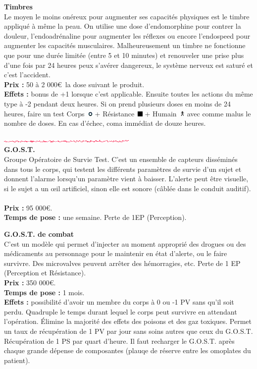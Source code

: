 \documentclass[11pt,twoside,a4paper]{article}
\def\imgCORPS{\includegraphics[width=0.25cm]{../../../../../imgGraphics/rolePlayingGame/SimulacreS/mini12x12/corps.png} }
\def\imgRESIS{\includegraphics[width=0.25cm]{../../../../../imgGraphics/rolePlayingGame/SimulacreS/mini12x12/resistance.png} }
\def\imgHUMAI{\includegraphics[width=0.25cm]{../../../../../imgGraphics/rolePlayingGame/SimulacreS/mini12x12/humain.png} }
\def\barreCyberAgeHalf{\includegraphics[width=0.50\textwidth]{img/Filet_CA.png}}
\begin{document}
\begin{multicols*}{2}
\textbf{Timbres}~\\
Le moyen le moins on{\'e}reux pour augmenter ses capacit{\'e}s physiques est le timbre appliqu{\'e} {\`a} m{\^e}me la peau. On utilise une dose d'endomorphine pour contrer la douleur, l'endoadr{\'e}naline pour augmenter les r{\'e}flexes ou encore l'endospeed pour augmenter les capacit{\'e}s musculaires. Malheureusement un timbre ne fonctionne que pour une dur{\'e}e limit{\'e}e (entre 5 et 10 minutes) et renouveler une prise plus d'une fois par 24 heures peux s'av{\'e}rer dangereux, le syst{\`e}me nerveux est satur{\'e} et c'est l'accident. ~\\
{\small 
	\textbf{Prix : }50 {\`a} 2 000\euro ~la dose suivant le produit. ~\\
	\textbf{Effets : }bonus de +1 lorsque c'est applicable. Ensuite toutes les actions du m{\^e}me type {\`a} -2 pendant deux heures. Si on prend plusieurs doses en moins de 24 heures, faire un test Corps~\imgCORPS + R{\'e}sistance~\imgRESIS + Humain~\imgHUMAI avec comme malus le nombre de doses. En cas d'{\'e}chec, coma imm{\'e}diat de douze heures. ~\\
} %

\barreCyberAgeHalf ~\\


\textbf{G.O.S.T.}~\\
Groupe Op{\'e}ratoire de Survie Test. C'est un ensemble de capteurs diss{\'e}min{\'e}s dans tous le corps, qui testent les diff{\'e}rents param{\`e}tres de survie d'un sujet et donnent l'alarme lorsqu'un param{\`e}tre vient {\`a} baisser. L'alerte peut {\^e}tre visuelle, si le sujet a un \oe il artificiel, sinon elle est sonore (c{\^a}bl{\'e}e dans le conduit auditif). ~\\
{\small 
	\textbf{Prix : }95 000\euro . ~\\
	\textbf{Temps de pose : }une semaine. Perte de 1EP (Perception). ~\\
} %

\textbf{G.O.S.T. de combat}~\\
C'est un mod{\`e}le qui permet d'injecter au moment appropri{\'e} des drogues ou des m{\'e}dicaments au personnage pour le maintenir en {\'e}tat d'alerte, ou le faire survivre. Des microvalves peuvent arr{\^e}ter des h{\'e}morragies, etc. Perte de 1 EP (Perception et R{\'e}sistance). ~\\
{\small 
	\textbf{Prix : }350 000\euro . ~\\
	\textbf{Temps de pose : }1 mois. ~\\
	\textbf{Effets : }possibilit{\'e} d'avoir un membre du corps {\`a} 0 ou -1 PV sans qu'il soit perdu. Quadruple le temps durant lequel le corps peut survivre en attendant l'op{\'e}ration. {\'E}limine la majorit{\'e} des effets des poisons et des gaz toxiques. Permet un taux de r{\'e}cup{\'e}ration de 1 PV par jour sans soins autres que ceux du G.O.S.T. R{\'e}cup{\'e}ration de 1 PS par quart d'heure. Il faut recharger le G.O.S.T. apr{\`e}s chaque grande d{\'e}pense de composantes (plauqe de r{\'e}serve entre les omoplates du patient). ~\\
} %


\end{multicols*}
\end{document}
